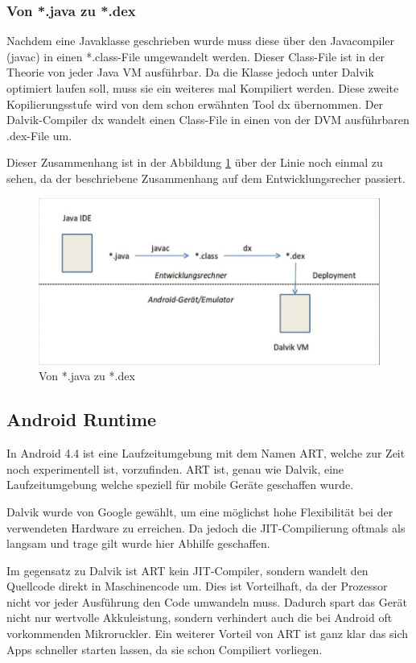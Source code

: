 \subsubsection{Von *.java zu *.dex}
Nachdem eine Javaklasse geschrieben wurde muss diese \"uber den Javacompiler (javac) in einen *.class-File umgewandelt werden. Dieser Class-File ist in der Theorie von jeder Java VM ausf\"uhrbar. Da die Klasse jedoch unter Dalvik optimiert laufen soll, muss sie ein weiteres mal Kompiliert werden. Diese zweite Kopilierungsstufe wird von dem schon erw\"ahnten Tool dx \"ubernommen. 
Der Dalvik-Compiler dx wandelt einen Class-File in einen von der \ac{DVM} ausf\"uhrbaren .dex-File um.

Dieser Zusammenhang ist in der Abbildung \ref{JavaZuDex} \"uber der Linie noch einmal zu sehen, da der beschriebene Zusammenhang auf dem Entwicklungsrecher passiert.

\begin{figure}[!ht]
\centering
\includegraphics[width=12cm]{Bilder/JavaZuDex}
\caption{Von *.java zu *.dex \cite{Android44}}
\label{JavaZuDex}
\centering
\end{figure}

\subsection{Android Runtime}
In Android 4.4 ist eine Laufzeitumgebung mit dem Namen \ac{ART}, welche zur Zeit noch experimentell ist, vorzufinden. \ac{ART} ist, genau wie Dalvik, eine Laufzeitumgebung welche speziell f\"ur mobile Ger\"ate geschaffen wurde. 

Dalvik wurde von Google gew\"ahlt, um eine m\"oglichst hohe Flexibilit\"at bei der verwendeten Hardware zu erreichen. Da jedoch die \ac{JIT}-Compilierung oftmals als langsam und trage gilt wurde hier Abhilfe geschaffen.

Im gegensatz zu Dalvik ist \ac{ART} kein \ac{JIT}-Compiler, sondern wandelt den Quellcode direkt in Maschinencode um. Dies ist Vorteilhaft, da der Prozessor nicht vor jeder Ausf\"uhrung den Code umwandeln muss. Dadurch spart das Ger\"at nicht nur wertvolle Akkuleistung, sondern verhindert auch die bei Android oft vorkommenden Mikroruckler. 
Ein weiterer Vorteil von \ac{ART} ist ganz klar das sich Apps schneller starten lassen, da sie schon Compiliert vorliegen.

